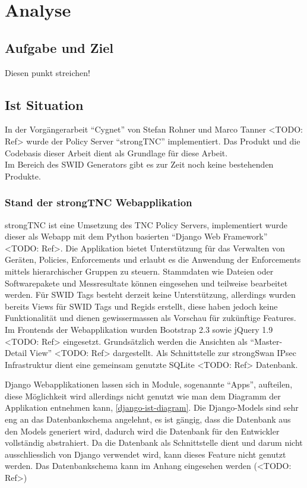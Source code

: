\chapter{Analyse}

\section{Aufgabe und Ziel}
Diesen punkt streichen!

\section{Ist Situation}
In der Vorgängerarbeit \enquote{Cygnet} von Stefan Rohner und Marco Tanner
<TODO: Ref> wurde der Policy Server \enquote{strongTNC} implementiert. Das
Produkt und die Codebasis dieser Arbeit dient als Grundlage für diese Arbeit.\\
Im Bereich des SWID Generators gibt es zur Zeit noch keine bestehenden Produkte.

\subsection{Stand der strongTNC Webapplikation} 
strongTNC ist eine Umsetzung des TNC Policy Servers, implementiert wurde dieser
als Webapp mit dem Python basierten \enquote{Django Web Framework} <TODO: Ref>.
Die Applikation bietet Unterstützung für das Verwalten von Geräten, Policies,
Enforcements und erlaubt es die Anwendung der Enforcements mittels
hierarchischer Gruppen zu steuern. Stammdaten wie Dateien oder Softwarepakete
und Messresultate können eingesehen und teilweise bearbeitet werden. Für SWID
Tags besteht derzeit keine Unterstützung, allerdings wurden bereits Views für
SWID Tags und Regids erstellt, diese haben jedoch keine Funktionalität und
dienen gewissermassen als Vorschau für zukünftige Features. \\
Im Frontends der Webapplikation wurden Bootstrap 2.3 sowie jQuery 1.9 <TODO:
Ref> eingesetzt. Grundsätzlich werden die Ansichten als \enquote{Master-Detail
View} <TODO: Ref> dargestellt.
Als Schnittstelle zur strongSwan IPsec Infrastruktur dient eine gemeinsam
genutzte SQLite <TODO: Ref> Datenbank. 

Django Webapplikationen lassen sich in Module, sogenannte \enquote{Apps},
aufteilen, diese Möglichkeit wird allerdings nicht genutzt wie man dem
Diagramm der Applikation entnehmen kann, \autoref{django-ist-diagram}. Die
Django-Models sind sehr eng an das Datenbankschema angelehnt, es ist gängig,
dass die Datenbank aus den Models generiert wird, dadurch wird die Datenbank für
den Entwickler vollständig abstrahiert. Da die Datenbank als Schnittstelle dient
und darum nicht ausschliesslich von Django verwendet wird, kann dieses Feature
nicht genutzt werden. Das Datenbankschema kann im Anhang eingesehen werden
(<TODO: Ref>)

